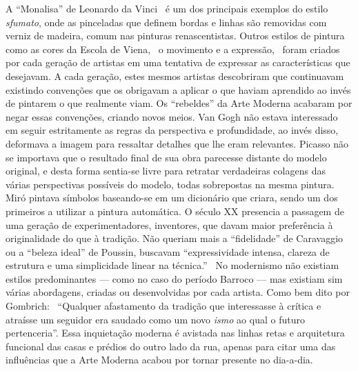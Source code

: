 A ``Monalisa'' de Leonardo da Vinci~\cite{pegus, hall} é um dos
principais exemplos do estilo \textit{sfumato}, onde as pinceladas que
definem bordas e linhas são removidas com verniz de madeira, comum nas
pinturas renascentistas. Outros estilos de pintura como as cores da
Escola de Viena,~\cite{gardner} o movimento e a
expressão,~\cite{gombrich, gordon} foram criados por cada geração de
artistas em uma tentativa de expressar as características que
desejavam. A cada geração, estes mesmos artistas descobriram que
continuavam existindo convenções que os obrigavam a aplicar o que
haviam aprendido ao invés de pintarem o que realmente viam. Os
``rebeldes'' da Arte Moderna acabaram por negar essas convenções,
criando novos meios. Van Gogh não estava interessado em seguir
estritamente as regras da perspectiva e profundidade, ao invés disso,
deformava a imagem para ressaltar detalhes que lhe eram
relevantes. Picasso não se importava que o resultado final de sua obra
parecesse distante do modelo original, e desta forma sentia-se livre
para retratar verdadeiras colagens das várias perspectivas possíveis
do modelo, todas sobrepostas na mesma pintura. Miró pintava símbolos
baseando-se em um dicionário que criara, sendo um dos primeiros a
utilizar a pintura automática. O século XX presencia a passagem de uma
geração de experimentadores, inventores, que davam maior preferência à
originalidade do que à tradição. Não queriam mais a ``fidelidade'' de
Caravaggio ou a ``beleza ideal'' de Poussin, buscavam ``expressividade
intensa, clareza de estrutura e uma simplicidade linear na
técnica.''~\cite{gombrich} No modernismo não existiam estilos
predominantes --- como no caso do período Barroco --- mas existiam sim
várias abordagens, criadas ou desenvolvidas por cada artista. Como bem
dito por Gombrich:~\cite{gombrich} ``Qualquer afastamento da tradição que
interessasse à crítica e atraísse um seguidor era saudado como um novo
\emph{ismo} ao qual o futuro pertenceria''. Essa inquietação moderna é
avistada nas linhas retas e arquitetura funcional das casas e prédios
do outro lado da rua, apenas para citar uma das influências que a Arte
Moderna acabou por tornar presente no dia-a-dia.

